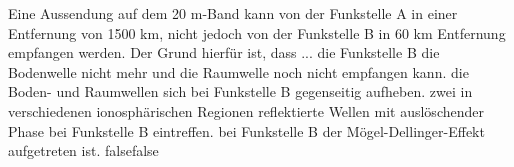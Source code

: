     {Eine Aussendung auf dem 20 m-Band kann von der Funkstelle A in einer Entfernung von 1500 km, nicht jedoch von der Funkstelle B in 60 km Entfernung empfangen werden. Der Grund hierfür ist, dass ...}
    {die Funkstelle B die Bodenwelle nicht mehr und die Raumwelle noch nicht empfangen kann.}
    {die Boden- und Raumwellen sich bei Funkstelle B gegenseitig aufheben.}
    {zwei in verschiedenen ionosphärischen Regionen reflektierte Wellen mit auslöschender Phase bei Funkstelle B eintreffen.}
    {bei Funkstelle B der Mögel-Dellinger-Effekt aufgetreten ist.}
    {false}{false}